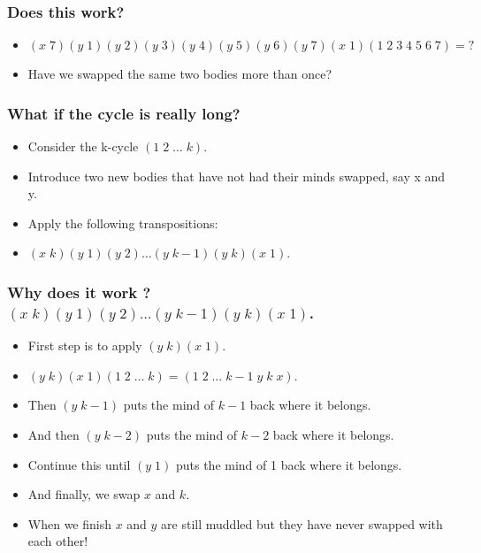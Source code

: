 \documentclass{beamer}
\begin{document}
  \begin{frame}
    \frametitle{Does this work?}


    \begin{itemize}
    \item $(x\;7)(y\;1)(y\;2)(y\;3)(y\;4)(y\;5)(y\;6)(y\;7)(x\;1)(1\;2\;3\;4\;5\;6\;7)=?$

\item Have we swapped the same two bodies more than once?

    \end{itemize}


\end{frame}

\begin{frame}
  \frametitle{What if the cycle is really long?}

  \begin{itemize}
  \item   Consider the k-cycle $(1\;2\; \hdots \;k)$.
    \item Introduce two new bodies that have not had their minds swapped, say x and y.
      \item Apply the following transpositions:        \item $(x\;k)(y\;1)(y\;2)\hdots(y\;k-1)(y\;k)(x\;1)$.
  \end{itemize}

\end{frame}

\begin{frame}
  \frametitle{Why does it work ?   $(x\;k)(y\;1)(y\;2)\hdots(y\;k-1)(y\;k)(x\;1)$.}
 
  \begin{itemize}

\item First step is to apply $(y\;k)(x\;1)$.
\item $(y\;k)(x\;1)(1\;2\; \ldots\; k) = (1\;2\;\hdots\;k-1 \;y\;k\;x)$.
  \item	Then $(y\;k-1)$ puts the mind of $k-1$ back where it belongs.
\item	And then $(y\;k-2)$ puts the mind of $k-2$ back where it belongs.
\item	Continue this until $(y\;1)$ puts the mind of 1 back where it belongs.
\item	And finally, we swap $x$ and $k$.
\item	When we finish $x$ and $y$ are still muddled but they have never swapped with each other!

  \end{itemize}


\end{frame}
\end{document}
